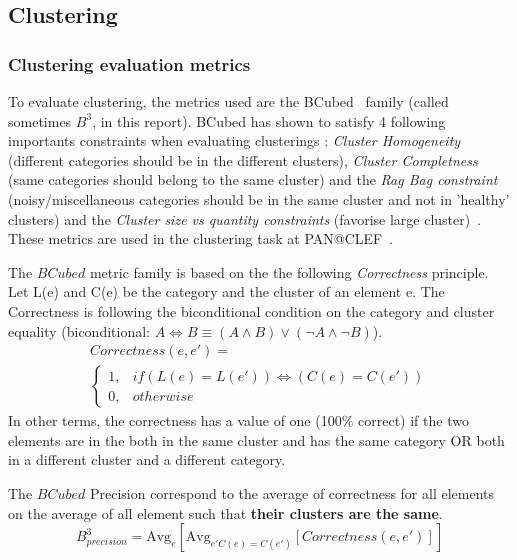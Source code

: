 \subsection{Clustering}

\subsubsection{Clustering evaluation metrics}

To evaluate clustering, the metrics used are the BCubed~\cite{bcubed} family (called sometimes $B^3$, in this report).
BCubed has shown to satisfy 4 following importants constraints when evaluating clusterings : \textit{Cluster Homogeneity} (different categories should be in the different clusters), \textit{Cluster Completness} (same categories should belong to the same cluster) and the \textit{Rag Bag constraint} (noisy/miscellaneous categories should be in the same cluster and not in 'healthy' clusters) and the \textit{Cluster size vs quantity constraints} (favorise large cluster)~\cite{bcubed}.
These metrics are used in the clustering task at PAN@CLEF~\cite{pan16}.

\begin{definition}
  The $BCubed$ metric family is based on the the following \textit{Correctness} principle.
  Let L(e) and C(e) be the category and the cluster of an element e.
  The Correctness is following the biconditional condition on the category and cluster equality (biconditional: $A \Longleftrightarrow B \equiv (A \land B) \lor (\neg A \land \neg B)$).
  \begin{gather*}
    Correctness(e, e') = \\
    \begin{cases}
      1, & if (L(e) = L(e')) \Longleftrightarrow (C(e) = C(e'))\\
      0, & otherwise
    \end{cases}
  \end{gather*}
  In other terms, the correctness has a value of one (100\% correct) if the two elements are in the both in the same cluster and has the same category OR both in a different cluster and a different category.
\end{definition}

\begin{definition}
  The $BCubed$ Precision correspond to the average of correctness for all elements on the average of all element such that \textbf{their clusters are the same}.
  \begin{equation}
    B^3_{precision} = \text{Avg}_{e}[\text{Avg}_{e' C(e)=C(e')}[Correctness(e, e')]]
  \end{equation}
\end{definition}

